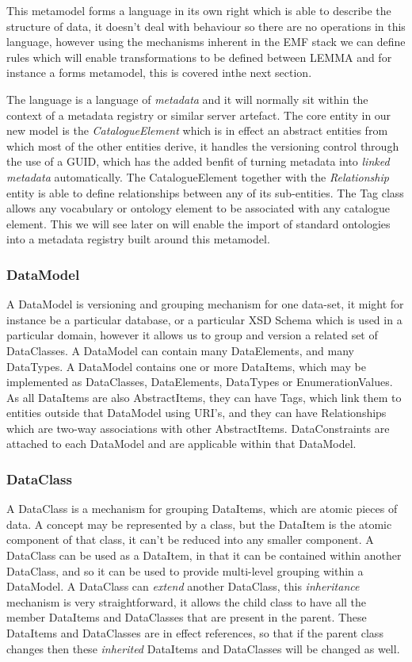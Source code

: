 \documentclass{llncs}
\begin{document}
This metamodel forms a language in its own right which is able to describe the structure of data, it doesn't deal with behaviour so there are no operations in this language, however using the mechanisms inherent in the EMF stack we can define rules which will enable transformations to be defined between LEMMA and for instance a forms metamodel, this is covered inthe next section.

The language is a language of \emph{metadata} and it will normally sit within the context of a metadata registry or similar server artefact. The core entity in our new model is the \emph{CatalogueElement} which is in effect an abstract entities from which most of the other entities derive, it handles the versioning control through the use of a GUID, which has the added benfit of turning metadata into \emph{linked metadata} automatically. The CatalogueElement together with the \emph{Relationship} entity is able to define relationships between any of its sub-entities. The Tag class allows any vocabulary or ontology element to be associated with any catalogue element. This we will see later on will enable the import of standard ontologies into a metadata registry built around this metamodel.

\subsubsection{DataModel}
A DataModel is versioning and grouping mechanism for one data-set, it might for instance be a particular database, or a particular XSD Schema which is used in a particular domain, however it allows us to group and version a related set of DataClasses. A DataModel can contain many DataElements, and many DataTypes. A DataModel contains one or more DataItems, which may be implemented as DataClasses, DataElements, DataTypes or EnumerationValues. As all DataItems are also AbstractItems, they can have Tags, which link them to entities outside that DataModel using URI's, and they can have Relationships which are two-way associations with other AbstractItems. DataConstraints are attached to each DataModel and are applicable within that DataModel.

\subsubsection{DataClass}
 A DataClass is a mechanism for grouping DataItems, which are atomic pieces of data. A concept may be represented by a class, but the DataItem is the atomic component of that class, it can't be reduced into any smaller component. A DataClass can be used as a DataItem, in that it can be contained within another DataClass, and so it can be used to provide multi-level grouping within a DataModel. A DataClass can \emph{extend} another DataClass, this \emph{inheritance} mechanism is very straightforward, it allows the child class to have all the member DataItems and DataClasses that are present in the parent. These DataItems and DataClasses are in effect references, so that if the parent class changes then these \emph{inherited} DataItems and DataClasses will be changed as well.
 
\end{document}
